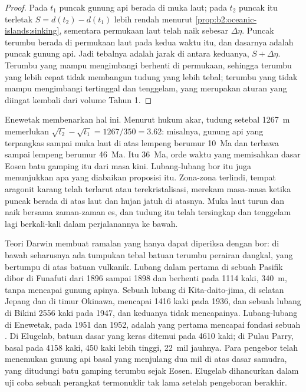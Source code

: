 \begin{proof}
Pada $t_1$ puncak gunung api berada di muka laut; pada $t_2$ puncak itu terletak $S = d(t_2) - d(t_1)$ lebih rendah menurut
\cref{prop:b2:oceanic-islands:sinking}, sementara permukaan laut telah naik sebesar $\Delta\eta$. Puncak
terumbu berada di permukaan laut pada kedua waktu itu, dan dasarnya adalah puncak gunung api. Jadi
tebalnya adalah jarak di antara keduanya, $S + \Delta\eta$. Terumbu yang mampu mengimbangi berhenti di
permukaan, sehingga terumbu yang lebih cepat tidak membangun tudung yang lebih tebal; terumbu yang tidak mampu mengimbangi tertinggal
dan tenggelam, yang merupakan aturan yang diingat kembali dari volume Tahun 1.
\end{proof}

Enewetak membenarkan hal ini. Menurut hukum akar, tudung setebal \qty{1267}{m} memerlukan $\sqrt{t_2} - \sqrt{t_1} =
1267/350 = 3.62$: misalnya, gunung api yang terpangkas sampai muka laut di atas lempeng berumur \qty{10}{Ma} dan
terbawa sampai lempeng berumur \qty{46}{Ma}. Itu \qty{36}{Ma}, orde waktu yang
memisahkan dasar Eosen batu gamping itu dari masa kini. Lubang-lubang bor itu juga menunjukkan apa yang
diabaikan proposisi itu. Zona-zona terlindi, tempat aragonit karang telah terlarut atau
terekristalisasi, merekam masa-masa ketika puncak  berada di atas laut dan hujan jatuh di atasnya.
Muka laut turun dan naik bersama zaman-zaman es, dan tudung itu telah tersingkap dan tenggelam lagi berkali-kali
dalam perjalanannya ke bawah.

\begin{history}
Teori Darwin membuat ramalan yang hanya dapat diperiksa dengan bor: di bawah  seharusnya
ada tumpukan tebal batuan terumbu perairan dangkal, yang bertumpu di atas batuan vulkanik. Lubang dalam pertama
di sebuah  Pasifik dibor di Funafuti dari 1896 sampai 1898 dan berhenti pada 1114 kaki,
\qty{340}{m}, tanpa mencapai gunung apinya. Sebuah lubang di Kita-daito-jima, di selatan Jepang dan di timur Okinawa,
mencapai 1416 kaki pada 1936, dan sebuah lubang di Bikini 2556 kaki pada 1947, dan keduanya tidak mencapainya. Lubang-lubang di Enewetak, pada
1951 dan 1952, adalah yang pertama mencapai fondasi sebuah . Di Elugelab, batuan dasar yang keras
ditemui pada 4610 kaki; di Pulau Parry, basal pada 4158 kaki, 450 kaki lebih tinggi, \num{22}~mil
jauhnya. Para pengebor telah menemukan gunung api basal yang menjulang dua mil di atas dasar samudra, yang ditudungi
batu gamping terumbu sejak Eosen. Elugelab dihancurkan dalam uji coba sebuah perangkat termonuklir
tak lama setelah pengeboran berakhir.
\end{history}

